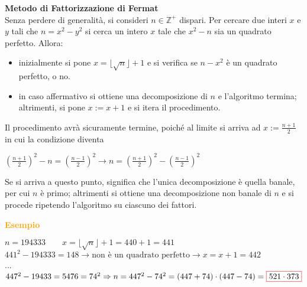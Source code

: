 \begin{flushleft}
    \textbf{Metodo di Fattorizzazione di Fermat} \\
    Senza perdere di generalità, si consideri $n \in \mathbb{Z}^+$ dispari. Per cercare due interi $x$ e $y$ tali che $n = x^2 - y^2$ si cerca un intero $x$ tale che $x^2 - n$ sia un quadrato perfetto. Allora:
    \begin{itemize}[nosep]
        \item inizialmente si pone $x = \lfloor \sqrt{n} \rfloor + 1$ e si verifica se $n - x^2$ è un quadrato perfetto, o no.
        \item in caso affermativo si ottiene una decomposizione di $n$ e l'algoritmo termina; altrimenti, si pone $x := x + 1$ e si itera il procedimento.
    \end{itemize}
    Il procedimento avrà sicuramente termine, poiché al limite si arriva ad $x := \frac{n + 1}{2}$ in cui la condizione diventa 

    {\centering
        $(\frac{n + 1}{2})^2 - n = (\frac{n - 1}{2})^2 \rightarrow n = (\frac{n + 1}{2})^2 - (\frac{n - 1}{2})^2$
    \par}
    Se si arriva a questo punto, significa che l'unica decomposizione è quella banale, per cui $n$ è primo; altrimenti si ottiene una decomposizione non banale di $n$ e si procede ripetendo l'algoritmo su ciascuno dei fattori.

    \begin{boxA}
        \textcolor{orange}{\textbf{Esempio}}
        
        {\centering
            $n = 194333 \qquad x = \lfloor \sqrt{n} \rfloor + 1 = 440 + 1 = 441$ \\
            $441^2 - 194333 = 148 \rightarrow \text{non è un quadrato perfetto} \rightarrow x = x + 1 = 442$ \\
            ... \\
            $447^2 - 19433 = 5476 = 74^2 \Rightarrow n = 447^2 - 74^2 = (447 + 74) \cdot (447 - 74) = \fcolorbox{red}{white}{$521 \cdot 373$}$
        \par}
    \end{boxA}
\end{flushleft}